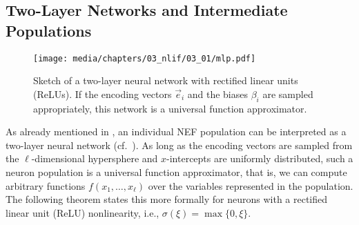 
\subsection{Two-Layer Networks and Intermediate Populations}

\begin{figure}
	\texttt{[image: media/chapters/03\_nlif/03\_01/mlp.pdf]}
	\caption[Sketch of a two-layer neural network]{Sketch of a two-layer neural network with rectified linear units (ReLUs). If the encoding vectors $\vec e_i$ and the biases $\beta_i$ are sampled appropriately, this network is a universal function approximator.}
	\label{fig:mlp}
\end{figure}

As already mentioned in , an individual NEF population can be interpreted as a two-layer neural network (cf.~).
As long as the encoding vectors are sampled from the $\ell$-dimensional hypersphere and $x$-intercepts are uniformly distributed, such a neuron population is a universal function approximator, that is, we can compute arbitrary functions $f(x_1, \ldots, x_\ell)$ over the variables represented in the population.
The following theorem states this more formally for neurons with a rectified linear unit (ReLU) nonlinearity, i.e., $\sigma(\xi) = \max\{0, \xi\}$.

